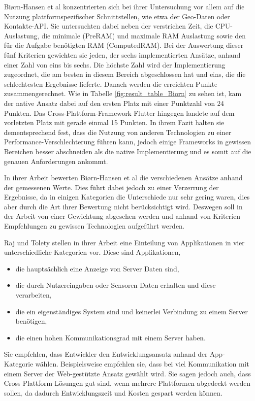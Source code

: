 Biørn-Hansen et al \cite{BirnHansen.2020} konzentrierten sich bei ihrer Untersuchung vor allem auf die Nutzung plattformspezifischer Schnittstellen, wie etwa der Geo-Daten oder Kontakte-API. Sie untersuchten dabei neben der verstrichen Zeit, die CPU-Auslastung, die minimale (PreRAM) und maximale RAM Auslastung sowie den für die Aufgabe benötigten RAM (ComputedRAM). Bei der Auswertung dieser fünf Kriterien gewichten sie jeden, der sechs implementierten Ansätze, anhand einer Zahl von eins bis sechs. Die höchste Zahl wird der Implementierung zugeordnet, die am besten in diesem Bereich abgeschlossen hat und eins, die die schlechtesten Ergebnisse lieferte. Danach werden die erreichten Punkte zusammengerechnet. Wie in Tabelle \ref{fig:result_table_Biorn} zu sehen ist, kam der native Ansatz dabei auf den ersten Platz mit einer Punktzahl von 24 Punkten. Das Cross-Plattform-Framework Flutter hingegen landete auf dem vorletzten Platz mit gerade einmal 15 Punkten. In ihrem Fazit halten sie dementsprechend fest, dass die Nutzung von anderen Technologien zu einer Performance-Verschlechterung führen kann, jedoch einige Frameworks in gewissen Bereichen besser abschneiden als die native Implementierung und es somit auf die genauen Anforderungen ankommt.

In ihrer Arbeit bewerten Biørn-Hansen et al \cite{BirnHansen.2020} die verschiedenen Ansätze anhand der gemessenen Werte. Dies führt dabei jedoch zu einer Verzerrung der Ergebnisse, da in einigen Kategorien die Unterschiede nur sehr gering waren, dies aber durch die Art ihrer Bewertung nicht berücksichtigt wird. Deswegen soll in der Arbeit von einer Gewichtung abgesehen werden und anhand von Kriterien Empfehlungen zu gewissen Technologien aufgeführt werden.

Raj und Tolety \cite{IEEE_Rahul_Seshu} stellen in ihrer Arbeit eine Einteilung von Applikationen in vier unterschiedliche Kategorien vor. Diese sind Applikationen,
\begin{itemize}
    \item die hauptsächlich eine Anzeige von Server Daten sind,
    \item die durch Nutzereingaben oder Sensoren Daten erhalten und diese verarbeiten,
    \item die ein eigenständiges System sind und keinerlei Verbindung zu einem Server benötigen,
    \item die einen hohen Kommunikationsgrad mit einem Server haben.
\end{itemize}
Sie empfehlen, dass Entwickler den Entwicklungsansatz anhand der App-Kategorie wählen. Beispielsweise empfehlen sie, dass bei viel Kommunikation mit einem Server der Web-gestützte Ansatz gewählt wird. Sie sagen jedoch auch, dass Cross-Plattform-Lösungen gut sind, wenn mehrere Plattformen abgedeckt werden sollen, da dadurch Entwicklungszeit und Kosten gespart werden können.

